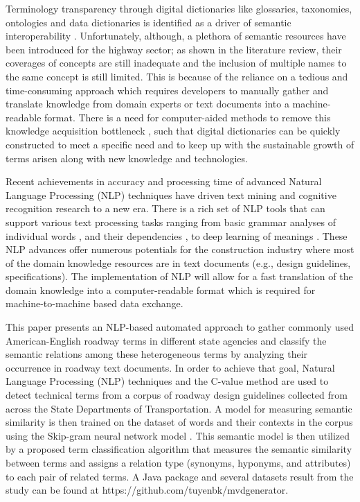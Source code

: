 \documentclass[Journal, BackFigs, DoubleSpace]{ascelike}%
\begin{document}
Terminology transparency through digital dictionaries like glossaries, taxonomies, ontologies and data dictionaries is identified as a driver of semantic interoperability \cite{ouksel99}. Unfortunately, although, a plethora of semantic resources have been introduced for the highway sector; as shown in the literature review, their coverages of concepts are still inadequate and the inclusion of multiple names to the same concept is still limited. This is because of the reliance on a tedious and time-consuming approach which requires developers to manually gather and translate knowledge from domain experts or text documents into a machine-readable format. There is a need for computer-aided methods to remove this knowledge acquisition bottleneck \cite{mounce10}, such that digital dictionaries can be quickly constructed to meet a specific need and to keep up with the sustainable growth of terms arisen along with new knowledge and technologies.
\par
Recent achievements in accuracy and processing time of advanced Natural Language Processing (NLP) techniques have driven text mining and cognitive recognition research to a new era. There is a rich set of NLP tools that can support various text processing tasks ranging from basic grammar analyses of individual words \cite{Toutanova03,Cunningham02}, and their dependencies \cite{chen14}, to deep learning of meanings \cite{mikolov13a,pennington2014glove}. These NLP advances offer numerous potentials for the construction industry where most of the domain knowledge resources are in text documents (e.g., design guidelines, specifications). The implementation of NLP will allow for a fast translation of the domain knowledge into a computer-readable format which is required for machine-to-machine based data exchange.
\par
This paper presents an NLP-based automated approach to gather commonly used American-English roadway terms in different state agencies and classify the semantic relations among these heterogeneous terms by analyzing their occurrence in roadway text documents. In order to achieve that goal, Natural Language Processing (NLP) techniques and the C-value method \cite{frantzi20} are used to detect technical terms from a corpus of roadway design guidelines collected from across the State Departments of Transportation. A model for measuring semantic similarity is then trained on the dataset of words and their contexts in the corpus using the Skip-gram neural network model \cite{mikolov13a}. This semantic model is then utilized by a proposed term classification algorithm that measures the semantic similarity between terms and assigns a relation type (synonyms, hyponyms, and attributes) to each pair of related terms. A Java package and several datasets result from the study can be found at https://github.com/tuyenbk/mvdgenerator.
\end{document}
